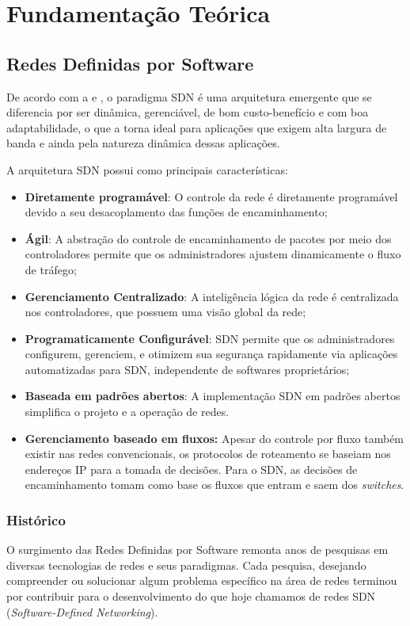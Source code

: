 \chapter{Fundamentação Teórica}

\section{Redes Definidas por Software}

De acordo com a  e , o paradigma SDN é uma arquitetura emergente que se diferencia por ser  dinâmica, gerenciável, de bom custo-benefício e com boa adaptabilidade, o que a torna ideal para aplicações que exigem alta largura de banda e ainda pela natureza dinâmica dessas aplicações.
\par A arquitetura SDN possui como principais características:

\begin{itemize}
    \item \textbf{Diretamente programável}: O controle da rede é diretamente programável devido a seu desacoplamento das funções de encaminhamento;
    \item \textbf{Ágil}: A abstração do controle de encaminhamento de pacotes por meio dos controladores permite que os administradores ajustem dinamicamente o fluxo de tráfego;
    \item \textbf{Gerenciamento Centralizado}: A inteligência lógica da rede é centralizada nos controladores, que possuem uma visão global da rede;
    \item \textbf{Programaticamente Configurável}: SDN permite que os administradores configurem, gerenciem, e otimizem sua segurança rapidamente via aplicações automatizadas para SDN, independente de softwares proprietários;
    \item \textbf{ Baseada em padrões abertos}: A implementação SDN em padrões abertos simplifica o projeto e a operação de redes.
    \item \textbf{Gerenciamento baseado em fluxos:}  Apesar do controle por fluxo também existir nas redes convencionais, os protocolos de roteamento se baseiam nos endereços IP para a tomada de decisões. Para o SDN, as decisões de encaminhamento tomam como base os fluxos que entram e saem dos \emph{switches}.
    
\end{itemize}

\subsection{Histórico}
O surgimento das Redes Definidas por Software remonta anos de pesquisas em diversas tecnologias de redes e seus paradigmas. Cada pesquisa, desejando compreender ou solucionar algum problema específico na área de redes terminou por contribuir para o desenvolvimento do que hoje chamamos de redes SDN (\textit{Software-Defined Networking}).

